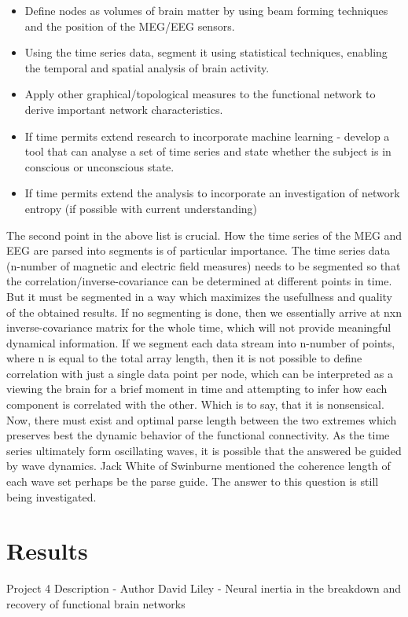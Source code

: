 \documentclass{article}
\begin{document}
\begin{itemize}
\item Define nodes as volumes of brain matter by using beam forming techniques and the position of the MEG/EEG sensors.
\item Using the time series data, segment it using statistical techniques, enabling the temporal and spatial analysis of brain activity.
\item Apply other graphical/topological measures to the functional network to derive important network characteristics.
\item If time permits extend research to incorporate machine learning - develop a tool that can analyse a set of time series and state whether the subject is in conscious or unconscious state.
\item If time permits extend the analysis to incorporate an investigation of network entropy (if possible with current understanding)
\end{itemize}
The second point in the above list is crucial. How the time series of the MEG and EEG are parsed into segments is of particular importance. The time series data (n-number of magnetic and electric field measures) needs to be segmented so that the correlation/inverse-covariance can be determined at different points in time. But it must be segmented in a way which maximizes the usefullness and quality of the obtained results. If no segmenting is done, then we essentially arrive at nxn inverse-covariance matrix for the whole time, which will not provide meaningful dynamical information. If we segment each data stream into n-number of points, where n is equal to the total array length, then it is not possible to define correlation with just a single data point per node, which can be interpreted as a viewing the brain for a brief moment in time and attempting to infer how each component is correlated with the other. Which is to say, that it is nonsensical. Now, there must exist and optimal parse length between the two extremes which preserves best the dynamic behavior of the functional connectivity. As the time series ultimately form oscillating waves, it is possible that the answered be guided by wave dynamics. Jack White of Swinburne mentioned the coherence length of each wave set perhaps be the parse guide. The answer to this question is still being investigated.
\section{Results}
Project 4 Description - Author David Liley - Neural inertia in the breakdown and recovery of functional brain networks
\\
\\
\end{document}
